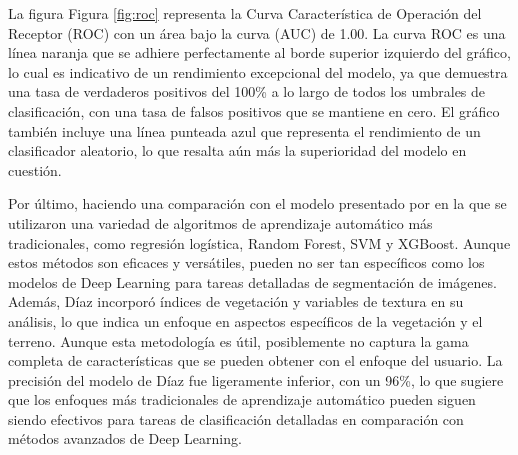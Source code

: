 La figura Figura \ref{fig:roc} representa la Curva Característica de Operación del Receptor (ROC) con un área bajo la curva (AUC) de 1.00. La curva ROC es una línea naranja que se adhiere perfectamente al borde superior izquierdo del gráfico, lo cual es indicativo de un rendimiento excepcional del modelo, ya que demuestra una tasa de verdaderos positivos del 100\% a lo largo de todos los umbrales de clasificación, con una tasa de falsos positivos que se mantiene en cero. El gráfico también incluye una línea punteada azul que representa el rendimiento de un clasificador aleatorio, lo que resalta aún más la superioridad del modelo en cuestión.

Por último, haciendo una comparación con el modelo presentado por \cite{diaz2023} en la que se utilizaron una variedad de algoritmos de aprendizaje automático más tradicionales, como regresión logística, Random Forest, SVM y XGBoost. Aunque estos métodos son eficaces y versátiles, pueden no ser tan específicos como los modelos de Deep Learning para tareas detalladas de segmentación de imágenes. Además, Díaz incorporó índices de vegetación y variables de textura en su análisis, lo que indica un enfoque en aspectos específicos de la vegetación y el terreno. Aunque esta metodología es útil, posiblemente no captura la gama completa de características que se pueden obtener con el enfoque del usuario. La precisión del modelo de Díaz fue ligeramente inferior, con un 96\%, lo que sugiere que los enfoques más tradicionales de aprendizaje automático pueden siguen siendo efectivos para tareas de clasificación detalladas en comparación con métodos avanzados de Deep Learning.
